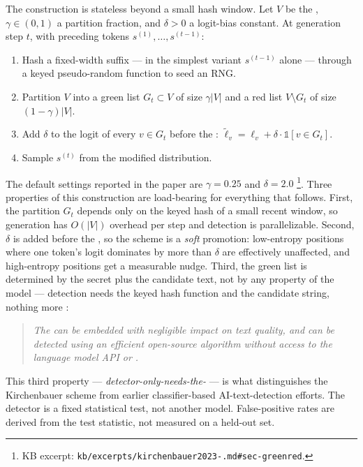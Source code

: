 The construction is stateless beyond a small hash window. Let $V$ be
the , $\gamma \in (0, 1)$ a partition fraction, and
$\delta > 0$ a logit-bias constant. At generation step $t$, with
preceding tokens $s^{(1)}, \ldots, s^{(t-1)}$:

\begin{enumerate}
\item Hash a fixed-width suffix --- in the simplest variant
$s^{(t-1)}$ alone --- through a keyed pseudo-random function to seed
an RNG.
\item Partition $V$ into a green list $G_t \subset V$ of size
$\gamma|V|$ and a red list $V \setminus G_t$ of size
$(1 - \gamma)|V|$.
\item Add $\delta$ to the logit of every $v \in G_t$ before the
: $\tilde{\ell}_v = \ell_v + \delta \cdot \mathbb{1}[v \in G_t]$.
\item Sample $s^{(t)}$ from the modified distribution.
\end{enumerate}

The default settings reported in the paper are $\gamma = 0.25$ and
$\delta = 2.0$%
\footnote{KB excerpt: \texttt{kb/excerpts/kirchenbauer2023-.md\#sec-greenred}.}.
Three properties of this construction are load-bearing for everything
that follows. First, the partition $G_t$ depends only on the keyed hash
of a small recent window, so generation has $O(|V|)$ overhead per step
and detection is parallelizable. Second, $\delta$ is added before the
, so the scheme is a \emph{soft} promotion: low-entropy positions
where one token's logit dominates by more than $\delta$ are effectively
unaffected, and high-entropy positions get a measurable nudge. Third,
the green list is determined by the secret  plus the candidate text,
not by any property of the model --- detection needs the keyed hash
function and the candidate string, nothing more
\citep[\S{}abstract]{kirchenbauer2023-watermark}:

\begin{quote}\itshape
The  can be embedded with negligible impact on text quality,
and can be detected using an efficient open-source algorithm without
access to the language model API or .
\end{quote}

This third property --- \emph{detector-only-needs-the-} --- is what
distinguishes the Kirchenbauer scheme from earlier classifier-based
AI-text-detection efforts. The detector is a fixed statistical test,
not another model. False-positive rates are derived from the test
statistic, not measured on a held-out set.

